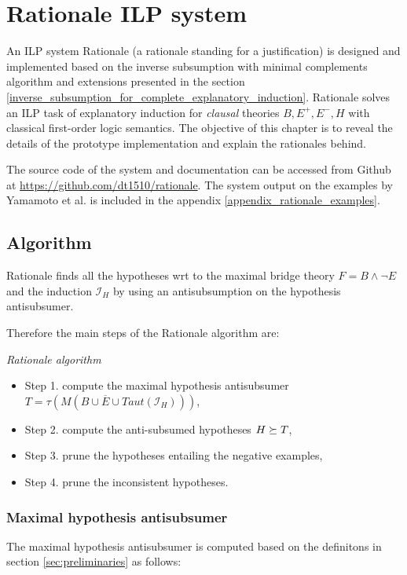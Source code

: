 \chapter{Rationale ILP system}\label{chap:rationale_ilp_system}
An ILP system Rationale (a rationale standing for a justification) is designed and implemented based on the inverse subsumption with minimal complements algorithm and extensions presented in the section \ref{inverse_subsumption_for_complete_explanatory_induction}. Rationale solves an ILP task of explanatory induction for \emph{clausal} theories $B, E^+, E^-, H$ with classical first-order logic semantics. The objective of this chapter is to reveal the details of the prototype implementation and explain the rationales behind.

The source code of the system and documentation can be accessed from Github at 
\url{https://github.com/dt1510/rationale}. The system output on the examples by Yamamoto et al. \cite{yamamoto2012inverse} is included in the appendix \ref{appendix_rationale_examples}.

\section{Algorithm}
Rationale finds all the hypotheses wrt to the maximal bridge theory $F=B \land \neg E$ and the induction $\mathcal{I}_H$ by using an antisubsumption on the hypothesis antisubsumer.

Therefore the main steps of the Rationale algorithm are:
\begin{algorithm}\emph{Rationale algorithm}
\begin{itemize}
\item Step 1. compute the maximal hypothesis antisubsumer
$T=\tau(M(B \cup \overline{E} \cup Taut(\mathcal{I}_H)))$,
\item Step 2. compute the anti-subsumed hypotheses $H \succeq T$,
\item Step 3. prune the hypotheses entailing the negative examples,
\item Step 4. prune the inconsistent hypotheses.
\end{itemize}
\end{algorithm}

\subsection{Maximal hypothesis antisubsumer}
The maximal hypothesis antisubsumer is computed based on the definitons in section \ref{sec:preliminaries} as follows:

